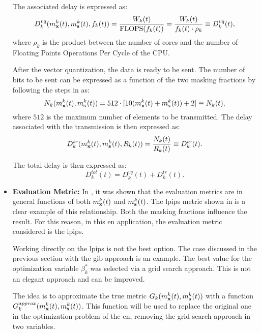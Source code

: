 \begin{itemize}[label={}]
    The associated delay is expressed as:
    \begin{equation}
        D_k^{vq}(m_{\mathbf{x}}^k(t), m_{\mathbf{s}}^k(t), f_k(t)) = \frac{W_k(t)}{\mathrm{FLOPS}(f_k(t))} = \frac{W_k(t)}{f_k(t) \cdot \rho_k} \equiv D_k^{vq}(t),
    \end{equation}
    where $\rho_k$ is the product between the number of cores and the number of Floating Points Operations Per Cycle of the CPU.

    After the vector quantization, the data is ready to be sent. The number of bits to be sent can be expressed as a function of the two masking fractions by following the steps in  as:
    \begin{equation}
        N_k(m_{\mathbf{x}}^k(t), m_{\mathbf{s}}^k(t)) = 512 \cdot [10(m_{\mathbf{x}}^k(t) + m_{\mathbf{s}}^k(t)) + 2] \equiv N_k(t),
    \end{equation}
    where $512$ is the maximum number of elements to be transmitted. The delay associated with the transmission is then expressed as:
    \begin{equation}
        D_k^{tr}(m_{\mathbf{x}}^k(t), m_{\mathbf{s}}^k(t), R_k(t)) = \frac{N_k(t)}{R_k(t)} \equiv D_k^{tr}(t).
    \end{equation}

    The total delay is then expressed as:
    \begin{equation}
        D_k^{tot}(t) = D_k^{vq}(t) + D_k^{tr}(t).
    \end{equation}
    \item \textbf{Evaluation Metric:} In , it was shown that the evaluation metrics are in general functions of both $m_{\mathbf{x}}^k(t)$ and $m_{\mathbf{s}}^k(t)$. The \gls{lpips} metric shown in  is a clear example of this relationship. Both the masking fractions influence the result. For this reason, in this \gls{en} application, the evaluation metric considered is the \gls{lpips}.

    Working directly on the \gls{lpips} is not the best option. The case discussed in the previous section with the \gls{gib} approach is an example. The best value for the optimization variable $\beta_k^*$ was selected via a grid search approach. This is not an elegant approach and can be improved.

    The idea is to approximate the true metric $G_k(m_{\mathbf{x}}^k(t), m_{\mathbf{s}}^k(t))$ with a function $G_k^{approx}(m_{\mathbf{x}}^k(t), m_{\mathbf{s}}^k(t))$. This function will be used to replace the original one in the optimization problem of the \gls{en}, removing the grid search approach in two variables.


\end{itemize}
